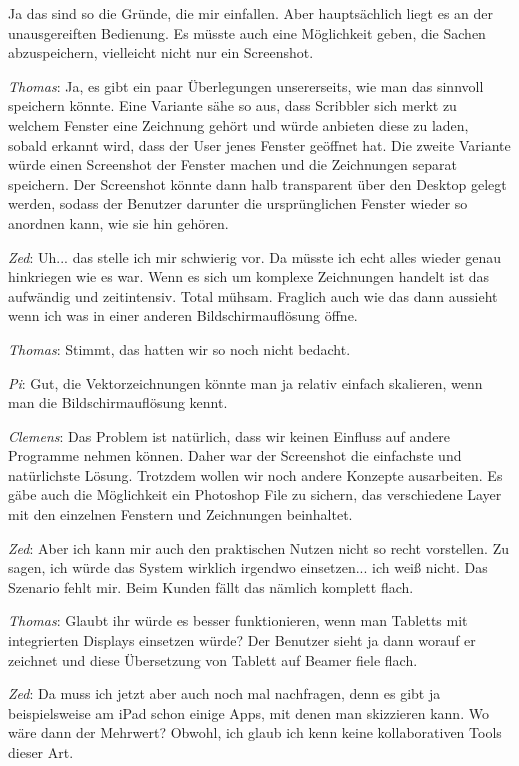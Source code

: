 Ja das sind so die Gründe, die mir einfallen. Aber hauptsächlich liegt es an der unausgereiften Bedienung. Es müsste auch eine Möglichkeit geben, die Sachen abzuspeichern, vielleicht nicht nur ein Screenshot.

\medskip \emph{Thomas}: Ja, es gibt ein paar Überlegungen unsererseits, wie man das sinnvoll speichern könnte. Eine Variante sähe so aus, dass Scribbler sich merkt zu welchem Fenster eine Zeichnung gehört und würde anbieten diese zu laden, sobald erkannt wird, dass der User jenes Fenster geöffnet hat. Die zweite Variante würde einen Screenshot der Fenster machen und die Zeichnungen separat speichern. Der Screenshot könnte dann halb transparent über den Desktop gelegt werden, sodass der Benutzer darunter die ursprünglichen Fenster wieder so anordnen kann, wie sie hin gehören.

\medskip \emph{Zed}: Uh... das stelle ich mir schwierig vor. Da müsste ich echt alles wieder genau hinkriegen wie es war. Wenn es sich um komplexe Zeichnungen handelt ist das aufwändig und zeitintensiv. Total mühsam. Fraglich auch wie das dann aussieht wenn ich was in einer anderen Bildschirmauflösung öffne.

\medskip \emph{Thomas}: Stimmt, das hatten wir so noch nicht bedacht.

\medskip \emph{Pi}: Gut, die Vektorzeichnungen könnte man ja relativ einfach skalieren, wenn man die Bildschirmauflösung kennt.

\medskip \emph{Clemens}: Das Problem ist natürlich, dass wir keinen Einfluss auf andere Programme nehmen können. Daher war der Screenshot die einfachste und natürlichste Lösung. Trotzdem wollen wir noch andere Konzepte ausarbeiten. Es gäbe auch die Möglichkeit ein Photoshop File zu sichern, das verschiedene Layer mit den einzelnen Fenstern und Zeichnungen beinhaltet.

\medskip \emph{Zed}: Aber ich kann mir auch den praktischen Nutzen nicht so recht vorstellen. Zu sagen, ich würde das System wirklich irgendwo einsetzen... ich weiß nicht. Das Szenario fehlt mir. Beim Kunden fällt das nämlich komplett flach.

\medskip \emph{Thomas}: Glaubt ihr würde es besser funktionieren, wenn man Tabletts mit integrierten Displays einsetzen würde? Der Benutzer sieht ja dann worauf er zeichnet und diese Übersetzung von Tablett auf Beamer fiele flach.

\medskip \emph{Zed}: Da muss ich jetzt aber auch noch mal nachfragen, denn es gibt ja beispielsweise am iPad schon einige Apps, mit denen man skizzieren kann. Wo wäre dann der Mehrwert? Obwohl, ich glaub ich kenn keine kollaborativen Tools dieser Art.

